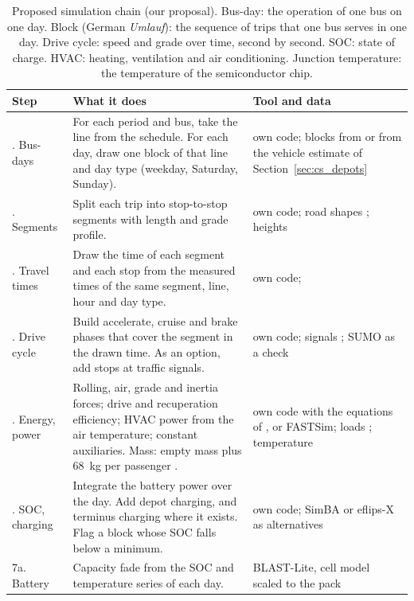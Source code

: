 \documentclass[11pt,a4paper]{article}
\theoremstyle{plain}
\theoremstyle{definition}
\theoremstyle{remark}
\begin{document}
\begin{table}[htbp]
\centering
\caption{Proposed simulation chain (our proposal).
Bus-day: the operation of one bus on one day. Block (German \emph{Umlauf}): the sequence of trips that one bus serves in one day.
Drive cycle: speed and grade over time, second by second. SOC: state of charge. HVAC: heating, ventilation and air conditioning.
Junction temperature: the temperature of the semiconductor chip.}
\label{tab:cs_sim_chain}
\small
\setlength{\tabcolsep}{4pt}
\begin{tabularx}{\linewidth}{@{}>{\hsize=0.523\hsize\raggedright\arraybackslash}X>{\hsize=1.671\hsize\raggedright\arraybackslash}X>{\hsize=0.805\hsize\raggedright\arraybackslash}X@{}}
\toprule
\rowcolor{headgrey}
\textbf{Step} & \textbf{What it does} & \textbf{Tool and data} \\
\midrule
1. Bus-days & For each period and bus, take the line from the schedule. For each day, draw one block of that line and day type (weekday, Saturday, Sunday). & own code; blocks from \cite{IstDaten2026} or from the vehicle estimate of Section~\ref{sec:cs_depots} \\
2. Segments & Split each trip into stop-to-stop segments with length and grade profile. & own code; road shapes \cite{ZVV2026GTFS}; heights \cite{Swisstopo2026Profile} \\
3. Travel times & Draw the time of each segment and each stop from the measured times of the same segment, line, hour and day type. & own code; \cite{VBZSollIst2023,IstDaten2026} \\
4. Drive cycle & Build accelerate, cruise and brake phases that cover the segment in the drawn time. As an option, add stops at traffic signals. & own code; signals \cite{OSMOverpass2026}; SUMO as a check \\
5. Energy, power & Rolling, air, grade and inertia forces; drive and recuperation efficiency; HVAC power from the air temperature; constant auxiliaries. Mass: empty mass plus 68~kg per passenger \cite[Sect.~3.3.2]{Heide2025}. & own code with the equations of \cite[Eqs.~1--2]{Konzept2025}, or FASTSim; loads \cite{VBZFahrgast2025}; temperature \cite{MeteoSwissSMN2026} \\
6. SOC, charging & Integrate the battery power over the day. Add depot charging, and terminus charging where it exists. Flag a block whose SOC falls below a minimum. & own code; SimBA or eflips-X as alternatives \\
7a. Battery & Capacity fade from the SOC and temperature series of each day. & BLAST-Lite, cell model scaled to the pack \\

\end{tabularx}
\end{table}
\end{document}
